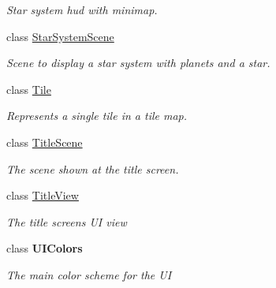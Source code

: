 \begin{DoxyCompactItemize}
\begin{DoxyCompactList}\small\item\em Star system hud with minimap. \end{DoxyCompactList}\item 
class \hyperlink{class_midnight_blue_1_1_star_system_scene}{Star\+System\+Scene}
\begin{DoxyCompactList}\small\item\em Scene to display a star system with planets and a star. \end{DoxyCompactList}\item 
class \hyperlink{class_midnight_blue_1_1_tile}{Tile}
\begin{DoxyCompactList}\small\item\em Represents a single tile in a tile map. \end{DoxyCompactList}\item 
class \hyperlink{class_midnight_blue_1_1_title_scene}{Title\+Scene}
\begin{DoxyCompactList}\small\item\em The scene shown at the title screen. \end{DoxyCompactList}\item 
class \hyperlink{class_midnight_blue_1_1_title_view}{Title\+View}
\begin{DoxyCompactList}\small\item\em The title screens UI view \end{DoxyCompactList}\item 
class {\bfseries U\+I\+Colors}
\begin{DoxyCompactList}\small\item\em The main color scheme for the UI \end{DoxyCompactList}\end{DoxyCompactItemize}
